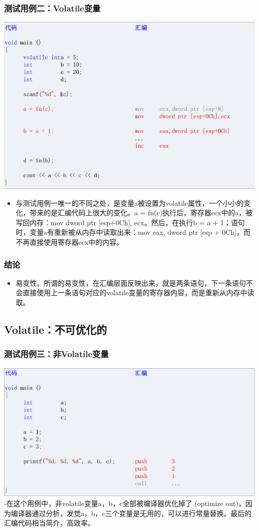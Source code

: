 \documentclass[9pt,b5paper]{article}
\begin{document}
\subsubsection{测试用例二：Volatile变量}
\label{sec-8-1-2}
\includegraphics[width=.9\linewidth]{../pic/v2.jpg}
\begin{itemize}
\item 与测试用例一唯一的不同之处，是变量a被设置为volatile属性，一个小小的变化，带来的是汇编代码上很大的变化。a = fn(c)执行后，寄存器ecx中的a，被写回内存：mov dword ptr [esp+0Ch], ecx。然后，在执行b = a + 1；语句时，变量a有重新被从内存中读取出来：mov eax, dword ptr [esp + 0Ch]，而不再直接使用寄存器ecx中的内容。
\end{itemize}
\subsubsection{结论}
\label{sec-8-1-3}
\begin{itemize}
\item 易变性。所谓的易变性，在汇编层面反映出来，就是两条语句，下一条语句不会直接使用上一条语句对应的volatile变量的寄存器内容，而是重新从内存中读取。
\end{itemize}
\subsection{Volatile：不可优化的}
\label{sec-8-2}
\subsubsection{测试用例三：非Volatile变量}
\label{sec-8-2-1}
\includegraphics[width=.9\linewidth]{../pic/v3.jpg}
  -在这个用例中，非volatile变量a，b，c全部被编译器优化掉了 (optimize out)，因为编译器通过分析，发觉a，b，c三个变量是无用的，可以进行常量替换。最后的汇编代码相当简介，高效率。
\end{document}
